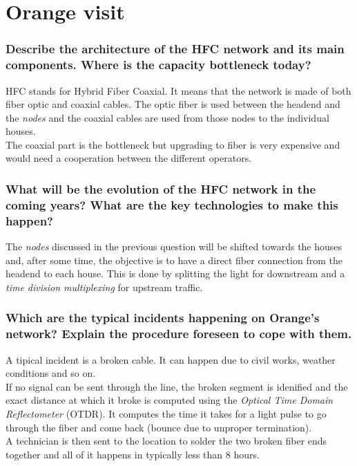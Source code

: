 \documentclass[10pt,a4paper]{ULBreport}
\begin{document}
\chapter{Orange visit}

\subsection{Describe the architecture of the HFC network and its main components. Where is the capacity bottleneck today?}

HFC stands for Hybrid Fiber Coaxial. It means that the network is made of both fiber optic and coaxial cables. The optic fiber is used between the headend and the \textit{nodes} and the coaxial cables are used from those nodes to the individual houses. \\
The coaxial part is the bottleneck but upgrading to fiber is very expensive and would need a cooperation between the different operators.

\subsection{What will be the evolution of the HFC network in the coming years? What are the key technologies to make this happen?}

The \textit{nodes} discussed in the previous question will be shifted towards the houses and, after some time, the objective is to have a direct fiber connection from the headend to each house. This is done by splitting the light for downstream and a \textit{time division multiplexing} for upstream traffic. 

\subsection{Which are the typical incidents happening on Orange's network? Explain the procedure foreseen to cope with them.}

A tipical incident is a broken cable. It can happen due to civil works, weather conditions and so on. \\
If no signal can be sent through the line, the broken segment is idenified and the exact distance at which it broke is computed using the \textit{Optical Time Domain Reflectometer} (OTDR). It computes the time it takes for a light pulse to go through the fiber and come back (bounce due to unproper termination).\\
A technician is then sent to the location to solder the two broken fiber ends together and all of it happens in typically less than 8 hours.
\end{document}
